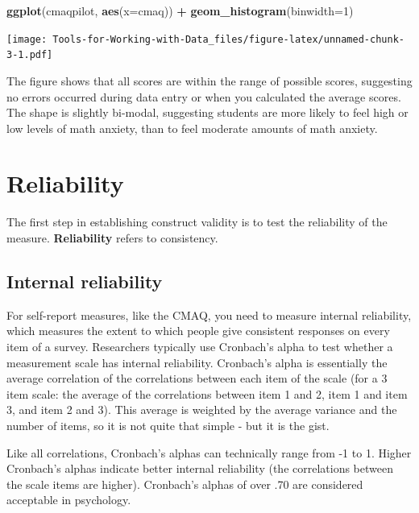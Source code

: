 \documentclass[
]{book}
\newenvironment{Shaded}{\begin{snugshade}}{\end{snugshade}}
\newcommand{\DataTypeTok}[1]{\textcolor[rgb]{0.13,0.29,0.53}{#1}}
\newcommand{\DecValTok}[1]{\textcolor[rgb]{0.00,0.00,0.81}{#1}}
\newcommand{\KeywordTok}[1]{\textcolor[rgb]{0.13,0.29,0.53}{\textbf{#1}}}
\newcommand{\NormalTok}[1]{#1}
\newcommand{\OperatorTok}[1]{\textcolor[rgb]{0.81,0.36,0.00}{\textbf{#1}}}
\newcommand{\StringTok}[1]{\textcolor[rgb]{0.31,0.60,0.02}{#1}}
\begin{document}
\begin{Shaded}
\begin{Highlighting}[]
\KeywordTok{ggplot}\NormalTok{(cmaqpilot, }\KeywordTok{aes}\NormalTok{(}\DataTypeTok{x=}\NormalTok{cmaq)) }\OperatorTok{+}\StringTok{ }
\StringTok{  }\KeywordTok{geom_histogram}\NormalTok{(}\DataTypeTok{binwidth=}\DecValTok{1}\NormalTok{)}
\end{Highlighting}
\end{Shaded}

\texttt{[image: Tools-for-Working-with-Data\_files/figure-latex/unnamed-chunk-3-1.pdf]}

The figure shows that all scores are within the range of possible scores, suggesting no errors occurred during data entry or when you calculated the average scores. The shape is slightly bi-modal, suggesting students are more likely to feel high or low levels of math anxiety, than to feel moderate amounts of math anxiety.

\hypertarget{reliability}{%
\section{Reliability}\label{reliability}}

The first step in establishing construct validity is to test the reliability of the measure. \textbf{Reliability} refers to consistency.

\hypertarget{internal-reliability}{%
\subsection{Internal reliability}\label{internal-reliability}}

For self-report measures, like the CMAQ, you need to measure internal reliability, which measures the extent to which people give consistent responses on every item of a survey. Researchers typically use Cronbach's alpha to test whether a measurement scale has internal reliability. Cronbach's alpha is essentially the average correlation of the correlations between each item of the scale (for a 3 item scale: the average of the correlations between item 1 and 2, item 1 and item 3, and item 2 and 3). This average is weighted by the average variance and the number of items, so it is not quite that simple - but it is the gist.

Like all correlations, Cronbach's alphas can technically range from -1 to 1. Higher Cronbach's alphas indicate better internal reliability (the correlations between the scale items are higher). Cronbach's alphas of over .70 are considered acceptable in psychology.
\end{document}

